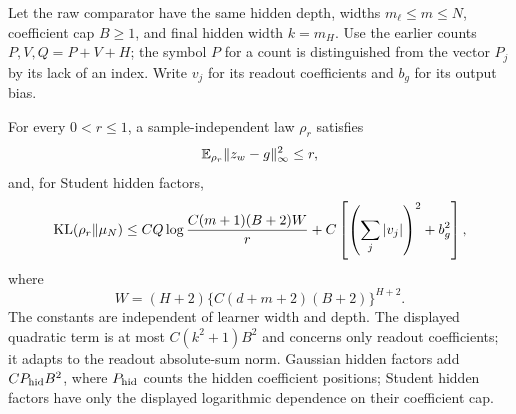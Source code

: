Let the raw comparator have the same hidden depth, widths $m_\ell\le m\le N$, coefficient cap $B\ge1$, and final hidden width $k=m_H$. Use the earlier counts $P,V,Q=P+V+H$; the symbol $P$ for a count is distinguished from the vector $P_j$ by its lack of an index. Write $v_j$ for its readout coefficients and $b_g$ for its output bias.

\begin{lemma}\label{lem:Dirichlet-comparison}
For every $0<r\le1$, a sample-independent law $\rho_r$ satisfies
\[
 \mathbb E_{\rho_r}\|z_w-g\|_\infty^2\le r,
\]
and, for Student hidden factors,
\begin{equation}
 \operatorname{KL}(\rho_r\|\mu_N)
 \le C Q\log\frac{C(m+1)(B+2)W}{r}
       +C\left[\left(\sum_j|v_j|\right)^2+b_g^2\right],
 \label{eq:Dirichlet-comparison-cost}
\end{equation}
where
\[W=(H+2)\{C(d+m+2)(B+2)\}^{H+2}.
\]
The constants are independent of learner width and depth. The displayed quadratic term is at most $C(k^2+1)B^2$ and concerns only readout coefficients; it adapts to the readout absolute-sum norm. Gaussian hidden factors add $CP_{\rm hid}B^2$, where $P_{\rm hid}$ counts the hidden coefficient positions; Student hidden factors have only the displayed logarithmic dependence on their coefficient cap.
\end{lemma}
